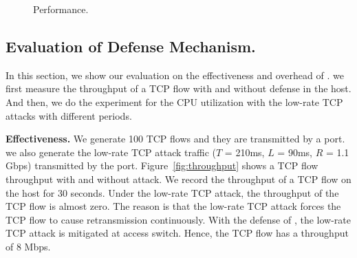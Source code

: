 \begin{figure}
\vspace{0in}
\centering

\vspace{-0.1in}
\caption{\small{Performance.}}
\label{fig:Performance}
\vspace{-0.2in}
\end{figure}

\subsection{Evaluation of Defense Mechanism.} 
In this section, we show our evaluation on the effectiveness and overhead of \TheName{}. we first measure the throughput of a TCP flow with and without defense in the host. And then, we do the experiment for the CPU utilization with the low-rate TCP attacks with different periods.

\noindent \textbf{Effectiveness.}  We generate 100 TCP flows and they are transmitted by a port. we also generate the low-rate TCP attack traffic ($T$ = 210ms, $L$ = 90ms, $R$ = 1.1 Gbps) transmitted by the port. Figure~\ref{fig:throughput} shows a TCP flow throughput with and without attack. We record the throughput of a TCP flow on the host for 30 seconds. Under the low-rate TCP attack, the throughput of the TCP flow is almost zero. The reason is that the low-rate TCP attack forces the TCP flow to cause retransmission continuously. With the defense of \TheName{}, the low-rate TCP attack is mitigated at access switch. Hence, the TCP flow has a throughput of 8 Mbps.

